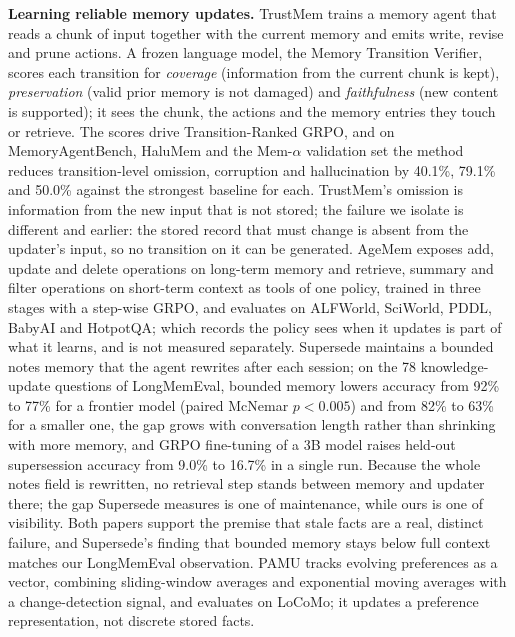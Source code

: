 \IfFileExists{IEEEtran.cls}{\documentclass[journal]{IEEEtran}\def\HAVEIEEE{1}}{\documentclass[10pt,twocolumn]{article}\usepackage[margin=0.7in,columnsep=0.25in]{geometry}}
\begin{document}
\textbf{Learning reliable memory updates.} TrustMem \cite{yang2026trustmem} trains a memory agent that reads a chunk of input together with the current memory and emits write, revise and prune actions. A frozen language model, the Memory Transition Verifier, scores each transition for \emph{coverage} (information from the current chunk is kept), \emph{preservation} (valid prior memory is not damaged) and \emph{faithfulness} (new content is supported); it sees the chunk, the actions and the memory entries they touch or retrieve. The scores drive Transition-Ranked GRPO, and on MemoryAgentBench, HaluMem and the Mem-$\alpha$ validation set the method reduces transition-level omission, corruption and hallucination by 40.1\%, 79.1\% and 50.0\% against the strongest baseline for each. TrustMem's omission is information from the new input that is not stored; the failure we isolate is different and earlier: the stored record that must change is absent from the updater's input, so no transition on it can be generated. AgeMem \cite{yu2026agemem} exposes add, update and delete operations on long-term memory and retrieve, summary and filter operations on short-term context as tools of one policy, trained in three stages with a step-wise GRPO, and evaluates on ALFWorld, SciWorld, PDDL, BabyAI and HotpotQA; which records the policy sees when it updates is part of what it learns, and is not measured separately. Supersede \cite{patel2026supersede} maintains a bounded notes memory that the agent rewrites after each session; on the 78 knowledge-update questions of LongMemEval, bounded memory lowers accuracy from 92\% to 77\% for a frontier model (paired McNemar $p<0.005$) and from 82\% to 63\% for a smaller one, the gap grows with conversation length rather than shrinking with more memory, and GRPO fine-tuning of a 3B model raises held-out supersession accuracy from 9.0\% to 16.7\% in a single run. Because the whole notes field is rewritten, no retrieval step stands between memory and updater there; the gap Supersede measures is one of maintenance, while ours is one of visibility. Both papers support the premise that stale facts are a real, distinct failure, and Supersede's finding that bounded memory stays below full context matches our LongMemEval observation. PAMU \cite{sun2026pamu} tracks evolving preferences as a vector, combining sliding-window averages and exponential moving averages with a change-detection signal, and evaluates on LoCoMo; it updates a preference representation, not discrete stored facts.
\end{document}
